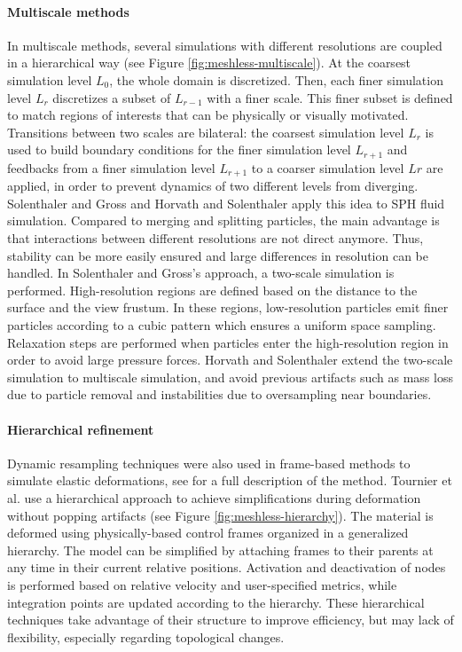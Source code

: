 \paragraph*{Multiscale methods}
In multiscale methods, several simulations with different resolutions are coupled in a hierarchical way (see Figure \ref{fig:meshless-multiscale}).
At the coarsest simulation level $L_{0}$, the whole domain is discretized. Then, each finer simulation level $L_{r}$ discretizes a subset of $L_{r-1}$ with a finer scale. This finer subset is defined to match regions of interests that can be physically or visually motivated. Transitions between two scales are bilateral: the coarsest simulation level $L_{r}$ is used to build boundary conditions for the finer simulation level $L_{r+1}$ and feedbacks from a finer simulation level $L_{r+1}$ to a coarser simulation level $L{r}$ are applied, in order to prevent dynamics of two different levels from diverging. Solenthaler and Gross \cite{Solenthaler2011} and Horvath and Solenthaler \cite{Horvath2013} apply this idea to SPH fluid simulation.
Compared to merging and splitting particles, the main advantage is that interactions between different resolutions are not direct anymore. Thus, stability can be more easily ensured and large differences in resolution can be handled.
In Solenthaler and Gross's approach, a two-scale simulation is performed. High-resolution regions are defined based on the distance to the surface and the view frustum. In these regions, low-resolution particles emit finer particles according to a cubic pattern which ensures a uniform space sampling. Relaxation steps are performed when particles enter the high-resolution region in order to avoid large pressure forces. Horvath and Solenthaler extend the two-scale simulation to multiscale simulation, and avoid previous artifacts such as mass loss due to particle removal and instabilities due to oversampling near boundaries.

\paragraph*{Hierarchical refinement}
Dynamic resampling techniques were also used in frame-based methods to simulate elastic deformations, see \cite{Gilles2011} for a full description of the method. Tournier et al. \cite{Tournier2014} use a hierarchical approach to achieve simplifications during deformation without popping artifacts (see Figure \ref{fig:meshless-hierarchy}). The material is deformed using physically-based control frames organized in a generalized hierarchy. The model can be simplified by attaching frames to their parents at any time in their current relative positions. Activation and deactivation of nodes is performed based on relative velocity and user-specified metrics, while integration points are updated according to the hierarchy. These hierarchical techniques take advantage of their structure to improve efficiency, but may lack of flexibility, especially regarding topological changes.


